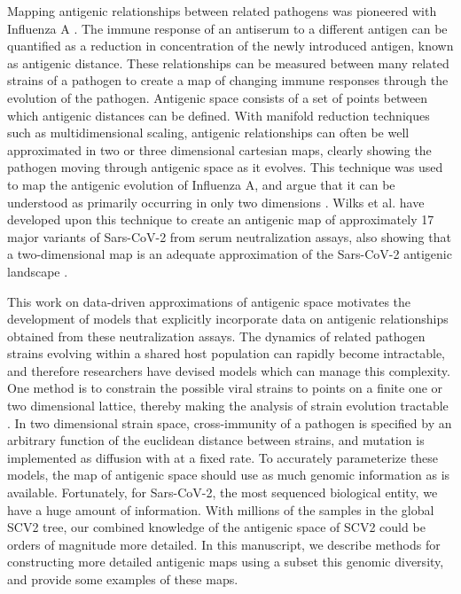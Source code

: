 \documentclass{article}
\begin{document}
Mapping antigenic relationships between related pathogens was pioneered with Influenza A \cite{lapedesGeometryShapeSpace2001}. 
The immune response of an antiserum to a different antigen can be quantified as a reduction in concentration of the newly introduced antigen, known as antigenic distance.
These relationships can be measured between many related strains of a pathogen to create a map of changing immune responses through the evolution of the pathogen.
Antigenic space consists of a set of points between which antigenic distances can be defined.
With manifold reduction techniques such as multidimensional scaling, antigenic relationships can often be well approximated in two or three dimensional cartesian maps, clearly showing the pathogen moving through antigenic space as it evolves.
This technique was used to map the antigenic evolution of Influenza A, and argue that it can be understood as primarily occurring in only two dimensions \cite{lapedesGeometryShapeSpace2001, smithMappingAntigenicGenetic2004}.
Wilks et al. have developed upon this technique to create an antigenic map of approximately 17 major variants of Sars-CoV-2 from serum neutralization assays, also showing that a two-dimensional map is an adequate approximation of the Sars-CoV-2 antigenic landscape \cite{millerAntigenicSpaceFramework2021, wilksMappingSARSCoV2Antigenic2022, van2022mapping}. 

This work on data-driven approximations of antigenic space motivates the development of models that explicitly incorporate data on antigenic relationships obtained from these neutralization assays.
The dynamics of related pathogen strains evolving within a shared host population can rapidly become intractable, and therefore researchers have devised models which can manage this complexity.
One method is to constrain the possible viral strains to points on a finite one or two dimensional lattice, thereby making the analysis of strain evolution tractable \cite{gogDynamicsSelectionManystrain2002} . 
In two dimensional strain space, cross-immunity of a pathogen is specified by an arbitrary function of the euclidean distance between strains, and mutation is implemented as diffusion with at a fixed rate. 
To accurately parameterize these models, the map of antigenic space should use as much genomic information as is available.
Fortunately, for Sars-CoV-2, the most sequenced biological entity, we have a huge amount of information. 
With millions of the samples in the global SCV2 tree, our combined knowledge of the antigenic space of SCV2 could be orders of magnitude more detailed.
In this manuscript, we describe methods for constructing more detailed antigenic maps using a subset this genomic diversity, and provide some examples of these maps.
\end{document}
